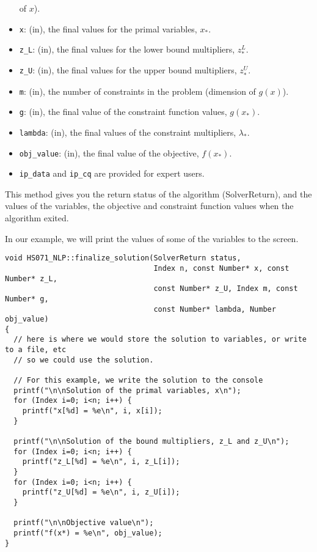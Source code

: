 \documentclass[10pt]{article}
\begin{document}
\begin{itemize}
  of $x$).
\item {\tt x}: (in), the final values for the primal variables, $x_*$.
\item {\tt z\_L}: (in), the final values for the lower bound
  multipliers, $z^L_*$.
\item {\tt z\_U}: (in), the final values for the upper bound
  multipliers, $z^U_*$.
\item {\tt m}: (in), the number of constraints in the problem
  (dimension of $g(x)$).
\item {\tt g}: (in), the final value of the constraint function
  values, $g(x_*)$.
\item {\tt lambda}: (in), the final values of the constraint
  multipliers, $\lambda_*$.
\item {\tt obj\_value}: (in), the final value of the objective,
  $f(x_*)$.
\item {\tt ip\_data} and {\tt ip\_cq} are provided for expert users.
\end{itemize}

This method gives you the return status of the algorithm
(SolverReturn), and the values of the variables, 
the objective and constraint function values when the algorithm exited.

In our example, we will print the values of some of the variables to 
the screen.

\begin{footnotesize}
\begin{verbatim}
void HS071_NLP::finalize_solution(SolverReturn status,
                                  Index n, const Number* x, const Number* z_L,
                                  const Number* z_U, Index m, const Number* g,
                                  const Number* lambda, Number obj_value)
{
  // here is where we would store the solution to variables, or write to a file, etc
  // so we could use the solution. 

  // For this example, we write the solution to the console
  printf("\n\nSolution of the primal variables, x\n");
  for (Index i=0; i<n; i++) {
    printf("x[%d] = %e\n", i, x[i]); 
  }

  printf("\n\nSolution of the bound multipliers, z_L and z_U\n");
  for (Index i=0; i<n; i++) {
    printf("z_L[%d] = %e\n", i, z_L[i]); 
  }
  for (Index i=0; i<n; i++) {
    printf("z_U[%d] = %e\n", i, z_U[i]); 
  }

  printf("\n\nObjective value\n");
  printf("f(x*) = %e\n", obj_value); 
}
\end{verbatim}
\end{footnotesize}
\end{document}
